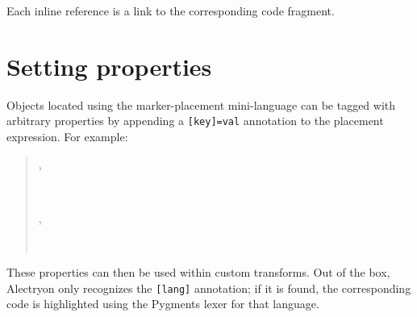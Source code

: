 \documentclass[a4paper]{article}
\begin{document}
Each inline reference is a link to the corresponding code fragment.


\section{Setting properties%
  \label{setting-properties}%
}

Objects located using the marker-placement mini-language can be tagged with arbitrary properties by appending a \texttt{{[}key{]}=val} annotation to the placement expression.  For example:

\begin{quote}
\begin{alectryon}
  \sep
  \begin{sentence}
    \begin{input}
      ~
    \end{input}
    \sep
    \begin{output}
      \begin{messages}
        \begin{message}
          \nl
          ~~~~~~
        \end{message}
      \end{messages}
    \end{output}
  \end{sentence}
\end{alectryon}
\end{quote}

These properties can then be used within custom transforms.  Out of the box, Alectryon only recognizes the \texttt{{[}lang{]}} annotation; if it is found, the corresponding code is highlighted using the Pygments lexer for that language.
\end{document}
